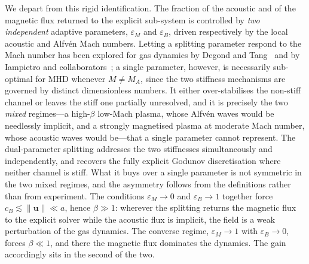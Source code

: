 \documentclass[a4paper,fleqn]{cas-sc}
\theoremstyle{remark}
\newcommand{\eps}{\varepsilon}
\newcommand{\epsM}{\eps_{M}}
\newcommand{\epsB}{\eps_{B}}
\begin{document}
We depart from this rigid identification. The fraction of the acoustic and of the
magnetic flux returned to the explicit sub-system is controlled by \emph{two
independent} adaptive parameters, $\varepsilon_M$ and $\varepsilon_B$, driven
respectively by the local acoustic and Alfv\'en Mach numbers. Letting a splitting
parameter respond to the Mach number has been explored for gas dynamics by Degond and
Tang~\cite{DegondTang2011} and by Iampietro and
collaborators~\cite{IampietroEtAl2018,IampietroEtAl2018b,IampietroEtAl2020}; a single
parameter, however, is necessarily sub-optimal for MHD whenever $M\neq M_A$, since
the two stiffness mechanisms are governed by distinct dimensionless numbers. It
either over-stabilises the non-stiff channel or leaves the stiff one partially
unresolved, and it is precisely the two \emph{mixed} regimes---a high-$\beta$
low-Mach plasma, whose Alfv\'en waves would be needlessly implicit, and a strongly
magnetised plasma at moderate Mach number, whose acoustic waves would be---that a
single parameter cannot represent. The dual-parameter splitting addresses the two stiffnesses simultaneously and
independently, and recovers the fully explicit Godunov discretisation where
neither channel is stiff. What it buys over a single parameter is not
symmetric in the two mixed regimes, and the asymmetry follows from the
definitions rather than from experiment. The conditions $\epsM\to0$ and
$\epsB\to1$ together force $c_B\lesssim\|\mathbf u\|\ll a$, hence
$\beta\gg1$: wherever the splitting returns the magnetic flux to the explicit
solver while the acoustic flux is implicit, the field is a weak perturbation of
the gas dynamics. The converse regime, $\epsM\to1$ with $\epsB\to0$, forces
$\beta\ll1$, and there the magnetic flux dominates the dynamics. The gain
accordingly sits in the second of the two.
\end{document}

